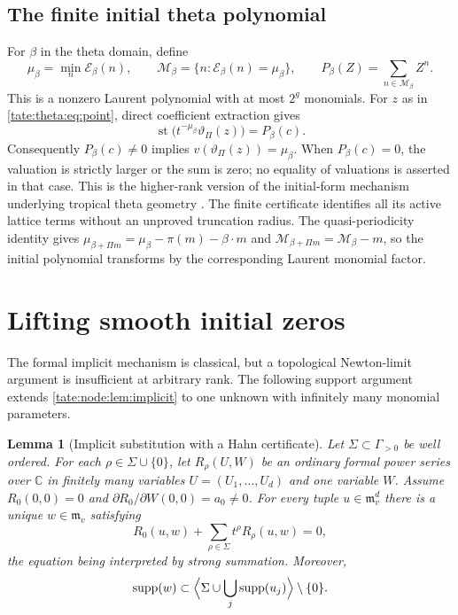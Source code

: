 \documentclass[11pt,letterpaper]{article}
\newtheorem{lemma}[lemma]{Lemma}
\theoremstyle{definition}
\newcommand{\C}{\mathbb C}
\newcommand{\supp}{\operatorname{supp}}
\newcommand{\m}{\mathfrak m}
\newcommand{\st}{\operatorname{st}}
\newcommand{\cE}{\mathcal E}
\newcommand{\cM}{\mathcal M}
\begin{document}
\subsection{The finite initial theta polynomial}

For $\beta$ in the theta domain, define
\begin{equation}
 \mu_\beta=\min_n\cE_\beta(n),\qquad
 \cM_\beta=\{n:\cE_\beta(n)=\mu_\beta\},\qquad
 P_\beta(Z)=\sum_{n\in\cM_\beta}Z^n.\label{tate:theta:eq:initial}
\end{equation}
This is a nonzero Laurent polynomial with at most $2^g$ monomials. For $z$
as in \eqref{tate:theta:eq:point}, direct coefficient extraction gives
\begin{equation}
 \st\bigl(t^{-\mu_\beta}\vartheta_\Pi(z)\bigr)=P_\beta(c).
 \label{tate:theta:eq:initialvalue}
\end{equation}
Consequently $P_\beta(c)\ne0$ implies $v(\vartheta_\Pi(z))=\mu_\beta$. When
$P_\beta(c)=0$, the valuation is strictly larger or the sum is zero; no
equality of valuations is asserted in that case. This is the higher-rank
version of the initial-form mechanism underlying tropical theta geometry
\cite{FRSS}. The finite certificate identifies all its active lattice terms
without an unproved truncation radius. The quasi-periodicity identity gives
$\mu_{\beta+\Pi m}=\mu_\beta-\pi(m)-\beta\cdot m$ and
$\cM_{\beta+\Pi m}=\cM_\beta-m$, so the initial polynomial transforms by the
corresponding Laurent monomial factor.

\section{Lifting smooth initial zeros}\label{tate:theta:sec:zeros}

The formal implicit mechanism is classical, but a topological Newton-limit
argument is insufficient at arbitrary rank. The following support argument
extends \cref{tate:node:lem:implicit} to one unknown with infinitely many
monomial parameters.

\begin{lemma}[Implicit substitution with a Hahn certificate]\label{tate:theta:lem:implicit}
Let $\Sigma\subset\Gamma_{>0}$ be well ordered. For each
$\rho\in\Sigma\cup\{0\}$, let $R_\rho(U,W)$ be an ordinary formal power
series over $\C$ in finitely many variables $U=(U_1,\ldots,U_d)$ and one
variable $W$. Assume $R_0(0,0)=0$ and
$\partial R_0/\partial W(0,0)=a_0\ne0$. For every tuple $u\in\m_v^d$ there
is a unique $w\in\m_v$ satisfying
\begin{equation}
 R_0(u,w)+\sum_{\rho\in\Sigma}t^\rho R_\rho(u,w)=0,\label{tate:theta:eq:implicit}
\end{equation}
the equation being interpreted by strong summation. Moreover,
\begin{equation}
 \supp(w)\subset
 \Bigl\langle\Sigma\cup\bigcup_j\supp(u_j)\Bigr\rangle\setminus\{0\}.
 \label{tate:theta:eq:implicitsupport}
\end{equation}
\end{lemma}
\end{document}
